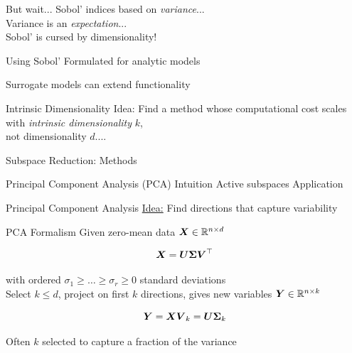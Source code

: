 \documentclass[14pt]{beamer}
\begin{document}
\begin{frame}{But wait...}
  Sobol' indices based on \emph{variance}... \\
  Variance is an \emph{expectation}... \\

  \bigskip Sobol' is cursed by dimensionality! \\
\end{frame}

\begin{frame}{Using Sobol'}
  Formulated for analytic models

  \bigskip Surrogate models can extend functionality
\end{frame}

\begin{frame}{Intrinsic Dimensionality}
  Idea: Find a method whose computational cost scales with \emph{intrinsic
    dimensionality} $k$,\\ \alert{not} dimensionality $d$....
\end{frame}

\begin{frame}{Subspace Reduction: Methods}
  \begin{outline}
    \1 Principal Component Analysis (PCA)
      \2 Intuition
    \1 Active subspaces
      \2 Application
  \end{outline}
\end{frame}

\begin{frame}{Principal Component Analysis}
  \huge\underline{Idea:} Find directions that capture variability
\end{frame}


\begin{frame}{PCA Formalism}
  Given zero-mean data $\boldsymbol{X}\in\mathbb{R}^{n\times d}$

  \begin{equation*}
    \boldsymbol{X} = \boldsymbol{U}\boldsymbol{\Sigma}\boldsymbol{V}^{\top}
  \end{equation*}

  \noindent with ordered $\sigma_1\geq\dots\geq\sigma_r\geq0$ standard
  deviations \\

  Select $k \leq d$, project on first $k$ directions, gives new variables
  $\boldsymbol{Y}\in\mathbb{R}^{n\times k}$

  \begin{equation*}
    \boldsymbol{Y} = \boldsymbol{X}\boldsymbol{V}_k = \boldsymbol{U}\boldsymbol{\Sigma}_k
  \end{equation*}

  Often $k$ selected to capture a fraction of the variance
\end{frame}
\end{document}
